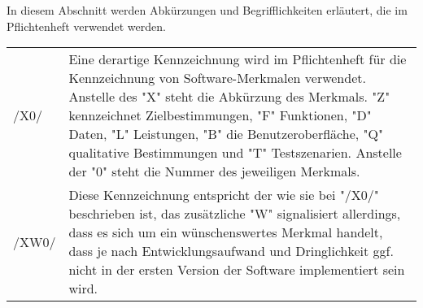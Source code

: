 In diesem Abschnitt werden Abkürzungen und Begrifflichkeiten erläutert, die im Pflichtenheft verwendet werden. \\[0.25cm]

\begin{tabular}{p{1.5cm}p{14.5cm}}

	/X0/	& Eine derartige Kennzeichnung wird im Pflichtenheft für die Kennzeichnung von Software-Merkmalen verwendet. Anstelle des "X" steht die Abkürzung des Merkmals. "Z" kennzeichnet Zielbestimmungen, "F" Funktionen, "D" Daten, "L" Leistungen, "B" die Benutzeroberfläche, "Q" qualitative Bestimmungen und "T" Testszenarien. Anstelle der "0" steht die Nummer des jeweiligen Merkmals.  \\
	/XW0/	& Diese Kennzeichnung entspricht der wie sie bei "/X0/" beschrieben ist, das zusätzliche "W" signalisiert allerdings, dass es sich um ein wünschenswertes Merkmal handelt, dass je nach Entwicklungsaufwand und Dringlichkeit ggf. nicht in der ersten Version der Software implementiert sein wird. \\

\end{tabular}